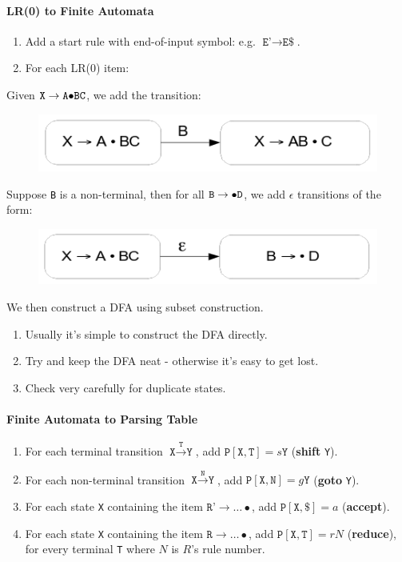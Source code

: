 \documentclass[twocolumn,english]{article}
\begin{document}
\paragraph{LR(0) to Finite Automata}
\begin{enumerate}
\item Add a start rule with end-of-input symbol: e.g. $\texttt{E'}\rightarrow\texttt{E}\texttt{\$}$. 
\item For each LR(0) item: 
\end{enumerate}
Given $\texttt{X}\rightarrow\texttt{A\ensuremath{\bullet}BC}$, we
add the transition:

\begin{figure}[H]
\centering{}\includegraphics[width=0.4\linewidth]{img/lr0tonfa} 
\end{figure}

Suppose \texttt{B} is a non-terminal, then for all $\texttt{B}\rightarrow\texttt{\ensuremath{\bullet}D}$,
we add $\epsilon$ transitions of the form:

\begin{figure}[H]
\centering{}\includegraphics[width=0.4\linewidth]{img/lr0tonfa-nonterminal} 
\end{figure}

We then construct a DFA using subset construction. 
\begin{enumerate}
\item Usually it's simple to construct the DFA directly. 
\item Try and keep the DFA neat - otherwise it's easy to get lost. 
\item Check very carefully for duplicate states. 
\end{enumerate}

\paragraph{Finite Automata to Parsing Table}
\begin{enumerate}
\item For each terminal transition $\texttt{X}\xrightarrow{\texttt{T}}\texttt{Y}$,
add $\texttt{P}[\texttt{X},\texttt{T}]=s\texttt{Y}$ (\textbf{shift}
\texttt{Y}). 
\item For each non-terminal transition $\texttt{X}\xrightarrow{\texttt{N}}\texttt{Y}$,
add $\texttt{P}[\texttt{X},\texttt{N}]=g\texttt{Y}$ (\textbf{goto}
\texttt{Y}). 
\item For each state \texttt{X} containing the item $\texttt{R'}\rightarrow\dots\bullet$,
add $\texttt{P}[\texttt{X},\texttt{\$}]=a$ (\textbf{accept}). 
\item For each state \texttt{X} containing the item $\texttt{R}\rightarrow\dots\bullet$,
add $\texttt{P}[\texttt{X},\texttt{T}]=rN$ (\textbf{reduce}), for
every terminal \texttt{T} where $N$ is $R$'s rule number. 
\end{enumerate}
\end{document}
